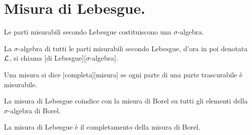 \section{Misura di Lebesgue.}
\label{Misura_MisuraDiLebesgue}
\begin{Theorem}
  Le parti misurabili secondo Lebesgue costituiscono una $\sigma$-algebra.
\end{Theorem}
\begin{Definition}
  La $\sigma$-algebra di tutti le parti misurabili secondo Lebesgue, d'ora in
  poi denotata $\mathcal{L}$, si chiama
  [di Lebesgue][$\sigma$-algebra].
\end{Definition}
\begin{Definition}
  Una misura si dice [completa][misura] se ogni parte di una
  parte trascurabile \`e misurabile.
\end{Definition}
\begin{Theorem}
  La misura di Lebesgue coindice con la misura di Borel su tutti gli elementi
  della $\sigma$-algebra di Borel.
\end{Theorem}
\begin{Theorem}
  La misura di Lebesgue \`e il completamento della misura di Borel.
\end{Theorem}
